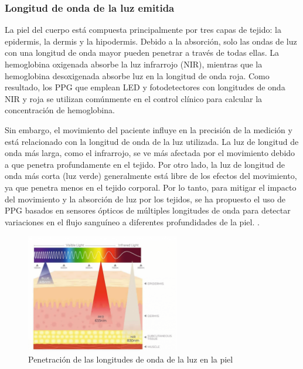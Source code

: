         \subsubsection{Longitud de onda de la luz emitida}
            La piel del cuerpo está compuesta principalmente por tres capas de tejido: la epidermis, la dermis y la hipodermis. Debido a la absorción, solo las ondas de luz con una longitud de onda mayor pueden penetrar a través de todas ellas. La hemoglobina oxigenada absorbe la luz infrarrojo (NIR), mientras que la hemoglobina desoxigenada absorbe luz en la longitud de onda roja. Como resultado, los PPG que emplean LED y fotodetectores con longitudes de onda NIR y roja se utilizan comúnmente en el control clínico para calcular la concentración de hemoglobina.

            Sin embargo, el movimiento del paciente influye en la precisión de la medición y está relacionado con la longitud de onda de la luz utilizada. La luz de longitud de onda más larga, como el infrarrojo, se ve más afectada por el movimiento debido a que penetra profundamente en el tejido. Por otro lado, la luz de longitud de onda más corta (luz verde) generalmente está libre de los efectos del movimiento, ya que penetra menos en el tejido corporal. Por lo tanto, para mitigar el impacto del movimiento y la absorción de luz por los tejidos, se ha propuesto el uso de PPG basados en sensores ópticos de múltiples longitudes de onda para detectar variaciones en el flujo sanguíneo a diferentes profundidades de la piel. \cite{Hiiberia_2023}.

            \begin{figure}[H]
                \centering
                \includegraphics[width=0.6\textwidth]{img/Marco/PPG_luz.jpg}
                \caption[Penetración de las longitudes de onda de la luz en la piel]{Penetración de las longitudes de onda de la luz en la piel\footnotemark}
                \label{fig:PPG_longitud_onda}
            \end{figure}

